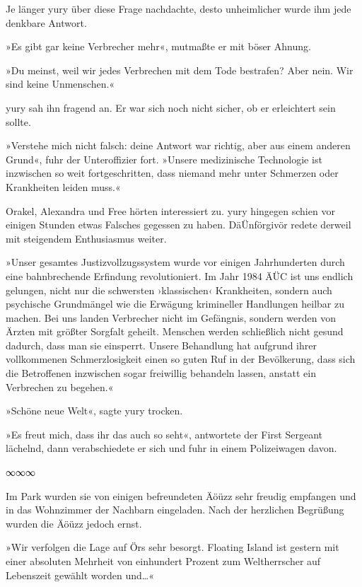 Je länger yury über diese Frage nachdachte, desto unheimlicher wurde ihm jede denkbare Antwort.

»Es gibt gar keine Verbrecher mehr«, mutmaßte er mit böser Ahnung.

»Du meinst, weil wir jedes Verbrechen mit dem Tode bestrafen? Aber nein. Wir sind keine Unmenschen.«

yury sah ihn fragend an. Er war sich noch nicht sicher, ob er erleichtert sein sollte.

»Verstehe mich nicht falsch: deine Antwort war richtig, aber aus einem anderen Grund«, fuhr der Unteroffizier fort. »Unsere medizinische Technologie ist inzwischen so weit fortgeschritten, dass niemand mehr unter Schmerzen oder Krankheiten leiden muss.«

Orakel, Alexandra und Free hörten interessiert zu. yury hingegen schien vor einigen Stunden etwas Falsches gegessen zu haben. DäÜnförgivör redete derweil mit steigendem Enthusiasmus weiter.

»Unser gesamtes Justizvollzugssystem wurde vor einigen Jahrhunderten durch eine bahnbrechende Erfindung revolutioniert. Im Jahr 1984 ÄÜC ist uns endlich gelungen, nicht nur die schwersten ›klassischen‹ Krankheiten, sondern auch psychische Grundmängel wie die Erwägung krimineller Handlungen heilbar zu machen. Bei uns landen Verbrecher nicht im Gefängnis, sondern werden von Ärzten mit größter Sorgfalt geheilt. Menschen werden schließlich nicht gesund dadurch, dass man sie einsperrt. Unsere Behandlung hat aufgrund ihrer vollkommenen Schmerzlosigkeit einen so guten Ruf in der Bevölkerung, dass sich die Betroffenen inzwischen sogar freiwillig behandeln lassen, anstatt ein Verbrechen zu begehen.«

»Schöne neue Welt«, sagte yury trocken.

»Es freut mich, dass ihr das auch so seht«, antwortete der First Sergeant lächelnd, dann verabschiedete er sich und fuhr in einem Polizeiwagen davon.

\begin{center}
    ∞∞∞
\end{center}

Im Park wurden sie von einigen befreundeten Äöüzz sehr freudig empfangen und in das Wohnzimmer der Nachbarn eingeladen. Nach der herzlichen Begrüßung wurden die Äöüzz jedoch ernst.

»Wir verfolgen die Lage auf Örs sehr besorgt. Floating Island ist gestern mit einer absoluten Mehrheit von einhundert Prozent zum Weltherrscher auf Lebenszeit gewählt worden und…«

